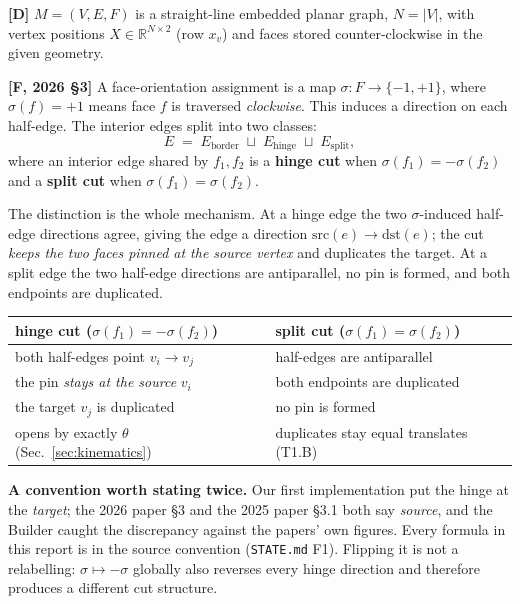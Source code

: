 \documentclass[11pt,a4paper]{article}
\theoremstyle{definition}
\newcommand{\Esplit}{E_{\mathrm{split}}}
\newcommand{\Ehinge}{E_{\mathrm{hinge}}}
\newcommand{\Eborder}{E_{\mathrm{border}}}
\newcommand{\file}[1]{\texttt{\small #1}}
\begin{document}
\textbf{[D]} $M=(V,E,F)$ is a straight-line embedded planar graph, $N=|V|$, with vertex
positions $X\in\mathbb{R}^{N\times2}$ (row $x_v$) and faces stored counter-clockwise in the
given geometry.

\textbf{[F, 2026 §3]} A face-orientation assignment is a map $\sigma:F\to\{-1,+1\}$, where
$\sigma(f)=+1$ means face $f$ is traversed \emph{clockwise}. This induces a direction on
each half-edge. The interior edges split into two classes:
\[
E \;=\; \Eborder \;\sqcup\; \Ehinge \;\sqcup\; \Esplit ,
\]
where an interior edge shared by $f_1,f_2$ is a \textbf{hinge cut} when
$\sigma(f_1)=-\sigma(f_2)$ and a \textbf{split cut} when $\sigma(f_1)=\sigma(f_2)$.

The distinction is the whole mechanism. At a hinge edge the two $\sigma$-induced half-edge
directions agree, giving the edge a direction $\mathrm{src}(e)\to\mathrm{dst}(e)$; the cut
\emph{keeps the two faces pinned at the source vertex} and duplicates the target. At a
split edge the two half-edge directions are antiparallel, no pin is formed, and both
endpoints are duplicated.

\begin{center}
\small
\begin{tabular}{@{}p{}p{}@{}}
\toprule
\textbf{hinge cut} ($\sigma(f_1)=-\sigma(f_2)$) & \textbf{split cut} ($\sigma(f_1)=\sigma(f_2)$)\\
\midrule
both half-edges point $v_i\to v_j$ &
half-edges are antiparallel \\
the pin \emph{stays at the source} $v_i$ &
both endpoints are duplicated \\
the target $v_j$ is duplicated &
no pin is formed \\
opens by exactly $\theta$ (Sec.~\ref{sec:kinematics}) &
duplicates stay equal translates (T1.B) \\
\bottomrule
\end{tabular}
\end{center}

\noindent
\textbf{A convention worth stating twice.} Our first implementation put the hinge at the
\emph{target}; the 2026 paper §3 and the 2025 paper §3.1 both say \emph{source}, and the
Builder caught the discrepancy against the papers' own figures. Every formula in this
report is in the source convention (\file{STATE.md} F1). Flipping it is not a relabelling:
$\sigma\mapsto-\sigma$ globally also reverses every hinge direction and therefore produces
a different cut structure.
\end{document}
